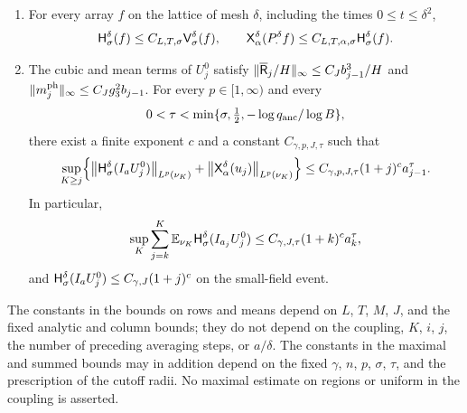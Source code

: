 \begin{theorem}
\begin{enumerate}
\item For every array $f$ on the lattice of mesh $\delta$, including the times $0\le t\le\delta^2$,
\[
 \mathsf H_{\sigma}^{\delta}(f)\le C_{L,T,\sigma}\mathsf V_{\sigma}^{\delta}(f),\qquad
 \mathsf X_{\alpha}^{\delta}(P_\cdot^\delta f)\le C_{L,T,\alpha,\sigma}\mathsf H_{\sigma}^{\delta}(f).
\]
\item The cubic and mean terms of $U_j^0$ satisfy $\lVert \overline{\mathsf R}_j/H\rVert_\infty\le C_Jb_{j-1}^3/H$ and $\lVert m_j^{\mathrm{ph}}\rVert_\infty\le C_Jg_3^2b_{j-1}$. For every $p\in[1,\infty)$ and every
\[
 0<\tau<\min\{\sigma,\tfrac12,-\log q_{\mathrm{anc}}/\log B\},
\]
there exist a finite exponent $c$ and a constant $C_{\gamma,p,J,\tau}$ such that
\[
 \sup_{K\ge j}\Bigl\{\bigl\|\mathsf H_{\sigma}^{\delta}(I_aU_j^0)\bigr\|_{L^p(\nu_K)}+\bigl\|\mathsf X_{\alpha}^{\delta}(u_j)\bigr\|_{L^p(\nu_K)}\Bigr\}\le C_{\gamma,p,J,\tau}(1+j)^ca_{j-1}^\tau.
\]
In particular,
\[
 \sup_K\sum_{j=k}^K\mathbb E_{\nu_K}\mathsf H_{\sigma}^{\delta}(I_{a_j}U_j^0)\le C_{\gamma,J,\tau}(1+k)^ca_k^\tau,
\]
and $\mathsf H_{\sigma}^{\delta}(I_aU_j^0)\le C_{\gamma,J}(1+j)^c$ on the small-field event.
\end{enumerate}
The constants in the bounds on rows and means depend on $L$, $T$, $M$, $J$, and the fixed analytic and column bounds; they do not depend on the coupling, $K$, $i$, $j$, the number of preceding averaging steps, or $a/\delta$. The constants in the maximal and summed bounds may in addition depend on the fixed $\gamma$, $n$, $p$, $\sigma$, $\tau$, and the prescription of the cutoff radii. No maximal estimate on regions or uniform in the coupling is asserted.
\end{theorem}

